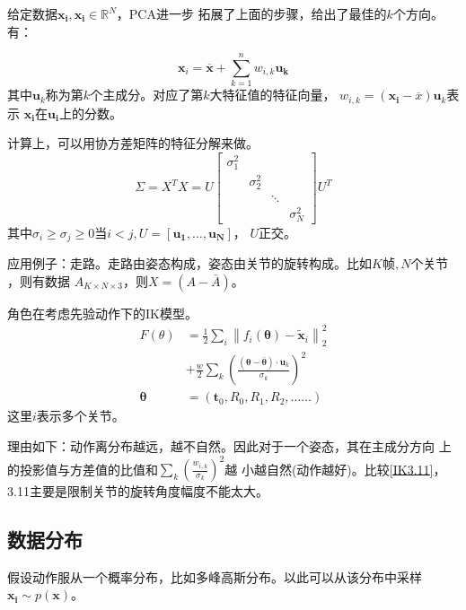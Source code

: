 \documentclass[lang=cn,newtx,10pt,scheme=chinese]{elegantbook}
\begin{document}
给定数据${\boldsymbol{x_i}}, \boldsymbol{x_i}\in \mathbb{R}^N$，PCA进一步
拓展了上面的步骤，给出了最佳的$k$个方向。有：

\begin{equation}
  \boldsymbol{x}_i=\overline{\boldsymbol{x}}+\sum_{k=1}^n w_{i, k} \boldsymbol{u}_{\boldsymbol{k}}
\end{equation}
其中$\boldsymbol{u}_k$称为第$k$个主成分。对应了第$k$大特征值的特征向量，
$w_{i, k}=(\boldsymbol{x_i} - \overline{x})\boldsymbol{u}_k$表示
$\boldsymbol{x_i} $在$\boldsymbol{u_i} $上的分数。

计算上，可以用协方差矩阵的特征分解来做。
\begin{equation}
  \Sigma=X^T X=U\left[\begin{array}{llll}
  \sigma_1^2 & & & \\
  & \sigma_2^2 & & \\
  & & \ddots & \\
  & & & \sigma_N^2
  \end{array}\right] U^T
\end{equation}
其中$\sigma_i \geq \sigma_j\geq 0\text{当}i<j, U = [\boldsymbol{u_1}, \dots, \boldsymbol{u_N}]$，
$U$正交。

应用例子：走路。走路由姿态构成，姿态由关节的旋转构成。比如$K\text{帧},N\text{个关节}$，则有数据
$A_{K \times N\times 3}$，则$X=(A-\bar{A})$。


角色在考虑先验动作下的IK模型。
\begin{equation}
  \label{IK4.8}
  \begin{aligned}
  F(\theta) & =\frac{1}{2} \sum_i\left\|f_i(\boldsymbol{\theta})-\widetilde{\boldsymbol{x}}_i\right\|_2^2 \\
  & +\frac{w}{2} \sum_k\left(\frac{(\boldsymbol{\theta}-\overline{\boldsymbol{\theta}}) \cdot \boldsymbol{u}_k}{\sigma_k}\right)^2 \\
  \boldsymbol{\theta} & =\left(\boldsymbol{t}_0, R_0, R_1, R_2, \ldots \ldots\right)
  \end{aligned}
\end{equation}
这里$i$表示多个关节。

理由如下：动作离分布越远，越不自然。因此对于一个姿态，其在主成分方向
上的投影值与方差值的比值和$\sum_{k}(\frac{w_{i,k}}{\sigma_k})^2$越
小越自然(动作越好)。比较\ref{IK3.11}，3.11主要是限制关节的旋转角度幅度不能太大。

\subsection{数据分布}
假设动作服从一个概率分布，比如多峰高斯分布。以此可以从该分布中采样$\boldsymbol{x_i}\sim p(\boldsymbol{x})$。
\end{document}
